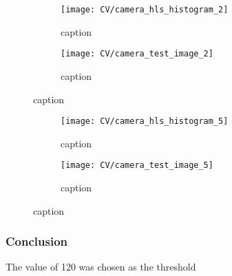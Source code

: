 \documentclass[../Head/Main.tex]{subfiles}
\begin{document}
\begin{figure}[H]
	\centering
	\begin{subfigure}[b]{0.48\textwidth}
		\centering
		\texttt{[image: CV/camera\_hls\_histogram\_2]}
		\caption{caption}
	\end{subfigure}
	\hfill
	\begin{subfigure}[b]{0.5\textwidth}
		\centering
		\texttt{[image: CV/camera\_test\_image\_2]}
		\caption{caption}
	\end{subfigure}
	\caption{caption}
\end{figure}

\begin{figure}[H]
	\centering
	\begin{subfigure}[b]{0.48\textwidth}
		\centering
		\texttt{[image: CV/camera\_hls\_histogram\_5]}
		\caption{caption}
	\end{subfigure}
	\hfill
	\begin{subfigure}[b]{0.5\textwidth}
		\centering
		\texttt{[image: CV/camera\_test\_image\_5]}
		\caption{caption}
	\end{subfigure}
	\caption{caption}
\end{figure}

\subsubsection{Conclusion}
The value of 120 was chosen as the threshold 
\end{document}
